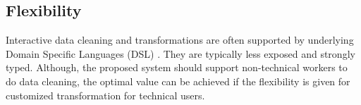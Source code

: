 \subsection{Flexibility}
\noindent Interactive data cleaning and transformations are often supported by underlying Domain Specific Languages (DSL) \cite{Wisteria}. They are typically less exposed and strongly typed. Although, the proposed system should support non-technical workers to do data cleaning, the optimal value can be achieved if the flexibility is given for customized transformation for technical users. 

